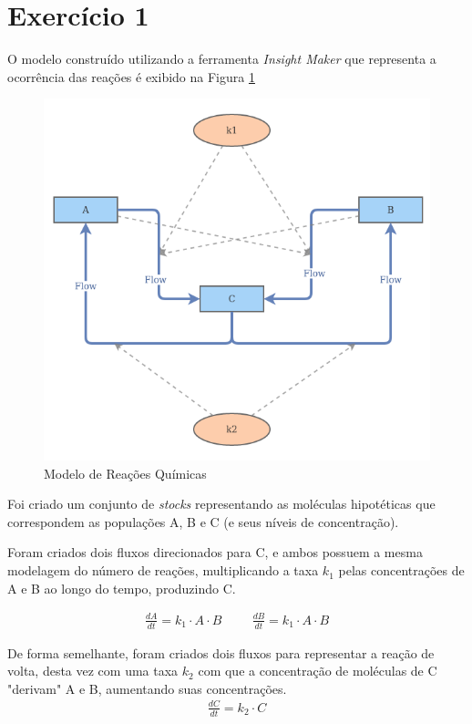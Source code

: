 \documentclass[a4paper, 12pt]{article}
\begin{document}
\section*{Exercício 1}

O modelo construído utilizando a ferramenta \emph{Insight Maker} que representa a ocorrência das reações é exibido na Figura \ref{fig:exampleFig1}

\begin{figure}[H]
    \centering
    \includegraphics[width=1\textwidth]{Images/Exercise 1/model.png}
    \caption{Modelo de Reações Químicas}
    \label{fig:exampleFig1}
\end{figure}

Foi criado um conjunto de \emph{stocks} representando as moléculas hipotéticas que correspondem as populações A, B e C (e seus níveis de concentração).

Foram criados dois fluxos direcionados para C, e ambos possuem a mesma modelagem do número de reações, multiplicando a taxa \emph{\(k_1\)} pelas concentrações de A e B ao longo do tempo, produzindo C.

\begin{align*}
    \frac{dA}{dt} = k_1 \cdot A \cdot B \hspace{1cm}
    \frac{dB}{dt} = k_1 \cdot A \cdot B
\end{align*}

De forma semelhante, foram criados dois fluxos para representar a reação de volta, desta vez com uma taxa \(k_2\) com que a concentração de moléculas de C "derivam" A e B, aumentando suas concentrações.
\begin{align*}
    \frac{dC}{dt} = k_2 \cdot C
\end{align*}
\end{document}
